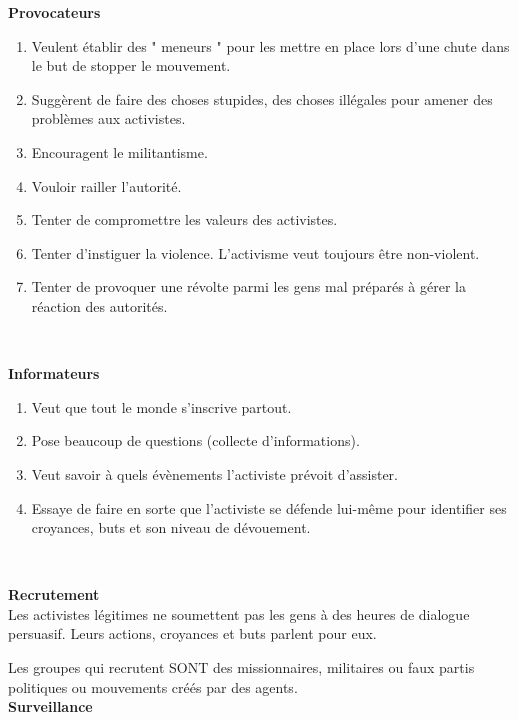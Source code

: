 \documentclass[11pt,twoside,a4paper]{article}
\begin{document}
\textbf{\large Provocateurs}~\\
\setlength\parindent{20pt}
\begin{enumerate}
	\item Veulent {\'e}tablir des " meneurs " pour les mettre en place lors d'une chute dans le but de stopper le mouvement. 
	\item Sugg{\`e}rent de faire des choses stupides, des choses ill{\'e}gales pour amener des probl{\`e}mes aux activistes. 
	\item Encouragent le militantisme. 
	\item Vouloir railler l'autorit{\'e}. 
	\item Tenter de compromettre les valeurs des activistes. 
	\item Tenter d'instiguer la violence. L'activisme veut toujours {\^e}tre non-violent.
	\item Tenter de provoquer une r{\'e}volte parmi les gens mal pr{\'e}par{\'e}s {\`a} g{\'e}rer la r{\'e}action des autorit{\'e}s.
\end{enumerate}~\\
\setlength\parindent{0pt}

\textbf{\large Informateurs}~\\
\setlength\parindent{20pt}
\begin{enumerate}
	\item Veut que tout le monde s'inscrive partout. 
	\item Pose beaucoup de questions (collecte d'informations). 
	\item Veut savoir {\`a} quels {\'e}v{\`e}nements l'activiste pr{\'e}voit d'assister. 
	\item Essaye de faire en sorte que l'activiste se d{\'e}fende lui-m{\^e}me pour identifier ses croyances, buts et son niveau de d{\'e}vouement.
\end{enumerate}~\\
\setlength\parindent{0pt}

\textbf{\large Recrutement}~\\

Les activistes l{\'e}gitimes ne soumettent pas les gens {\`a} des heures de dialogue persuasif. Leurs actions, croyances et buts parlent pour eux.

Les groupes qui recrutent SONT des missionnaires, militaires ou faux partis politiques ou mouvements cr{\'e}{\'e}s par des agents.~\\

\textbf{\large Surveillance}~\\
\end{document}
